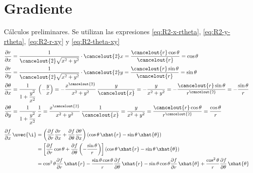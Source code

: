 \section{Gradiente}
Cálculos preliminares. Se utilizan las expresiones \eqref{eq:R2-x-rtheta},
\eqref{eq:R2-y-rtheta}, \eqref{eq:R2-r-xy} y \eqref{eq:R2-theta-xy}
{\small
\begin{subequations}
  \begin{align}
    \dfrac{\partial r}{\partial x}
    &=
      \dfrac{1}{\cancelout{2}\sqrt{x^2+y^2}}\cdot \cancelout{2}x
      = \dfrac{\cancelout{r}\cos\theta}{\cancelout{r}} = \cos\theta\\
    \dfrac{\partial r}{\partial y}
    &=
      \dfrac{1}{\cancelout{2}\sqrt{x^2+y^2}}\cdot \cancelout{2}y
      = \dfrac{\cancelout{r}\sin\theta}{\cancelout{r}} = \sin\theta\\
    \dfrac{\partial\theta}{\partial x}
    &=
      \dfrac{1}{1+\dfrac{y^2}{x^2}}\,\left(-\dfrac{y}{x}\right)
      = -\dfrac{x^{\cancelout{\scriptstyle{2}}}}{x^2+y^2}\,\dfrac{y}{\cancelout{x}}
      = -\dfrac{y}{x^2+y^2}
      = -\dfrac{\cancelout{r}\sin\theta}{r^{\cancelout{2}}}
      = -\dfrac{\sin\theta}{r}\\
    \dfrac{\partial\theta}{\partial y}
    &=
      \dfrac{1}{1+\dfrac{y^2}{x^2}}\,\dfrac{1}{x}
      = \dfrac{x^{\cancelout{\scriptstyle{2}}}}{x^2+y^2}\,\dfrac{1}{\cancelout{x}}
      = \dfrac{y}{x^2+y^2}
      = \dfrac{\cancelout{r}\cos\theta}{r^{\cancelout{\scriptstyle{2}}}}
      = \dfrac{\cos\theta}{r}
  \end{align}
\end{subequations}
}
{\small
  \begin{subequations}
    \begin{align*}
      \dfrac{\partial f}{\partial x}\,\uvec{\i}
      &=
        \left(%
        \dfrac{\partial f}{\partial r}\dfrac{\partial r}{\partial x}
        + \dfrac{\partial f}{\partial\theta}\dfrac{\partial\theta}{\partial x}
        \right)
        \left(%
        \cos\theta\,\xhat{r}-\sin\theta\,\xhat{\theta}
        \right)\\
      &=
        \left[%
        \dfrac{\partial f}{\partial r}\cos\theta
        + \dfrac{\partial f}{\partial\theta}\left(-\dfrac{\sin\theta}{r}\right)
        \right]
        \left(%
        \cos\theta\,\xhat{r} - \sin\theta\,\xhat{\theta}
        \right)\\
      &=
        \cos^2\theta\dfrac{\partial f}{\partial r}\,\xhat{r}
        -\dfrac{\sin\theta\cos\theta}{r}\dfrac{\partial f}{\partial\theta}\,\xhat{r}
        - \sin\theta\cos\theta\dfrac{\partial f}{\partial r}\,\xhat{\theta}
        + \dfrac{\cos^2\theta}{r}\dfrac{\partial f}{\partial\theta}\,\xhat{\theta}
    \end{align*}
  \end{subequations}
}
